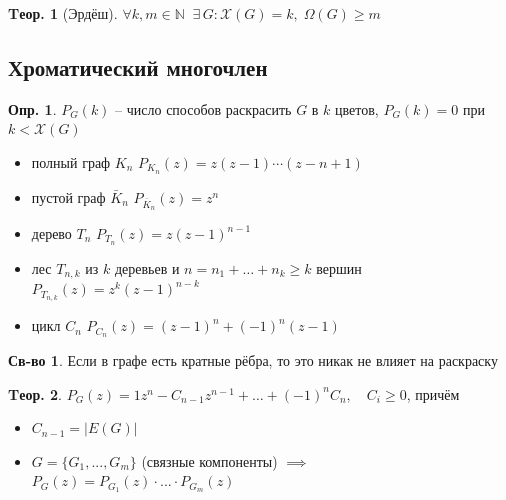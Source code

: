 \documentclass[a4paper,12pt]{article}
\numberwithin{figure}{section}
\theoremstyle{definition}
\newtheorem{definition}{Опр.}[section]
\newtheorem*{property}{Св-во}  %
\theoremstyle{definition}
\newtheorem{theorem}{Tеор.}[section]
\def\iiChi{\mathcal{X}}
\begin{document}
\begin{theorem}[Эрдёш]
	$\forall k,m \in \mathbb{N} \;\; \exists \, G: \iiChi(G)=k, \; \Omega(G) \geqslant m$
\end{theorem}


\subsection{Хроматический многочлен}


\begin{definition}
	$P_G(k)$ -- число способов раскрасить $G$ в $k$ цветов, $P_G(k)=0$ при $k<\iiChi(G)$
\end{definition}

\begin{itemize}
	\item полный граф $K_n$ \quad $P_{K_n}(z) = z(z-1)\cdots(z-n+1)$
	\item пустой граф $\bar{K}_n$ \quad $P_{\overline{K}_n}(z) = z^n$
	\item дерево $T_n$ \quad $P_{T_n}(z) = z(z-1)^{n-1}$
	\item лес $T_{n,k}$ из $k$ деревьев и $n=n_1+\dots+n_k \geqslant k$ вершин \quad $P_{T_{n,k}}(z) = z^k(z-1)^{n-k}$
	\item цикл $C_{n}$ \quad $P_{C_{n}}(z) = (z-1)^n + (-1)^n(z-1)$
\end{itemize}

\begin{property}
	Если в графе есть кратные рёбра, то это никак не влияет на раскраску
\end{property}

\begin{theorem}
	$ P_G(z) = 1 z^n - C_{n-1} z^{n-1} +\dots + (-1)^n C_n, \quad C_i \geqslant 0 $,
	причём
	\begin{itemize}
		\item  $C_{n-1} = |E(G)|$
		\item  $G=\{G_1,...,G_m\}$ (связные компоненты)
		       $\implies$ $P_G(z) = P_{G_1}(z) \cdot ... \cdot P_{G_m}(z)$ 
	\end{itemize}
\end{theorem}

\def\iiRemoveEdge{-}
\def\iiPullEdge{\sim}
\end{document}
